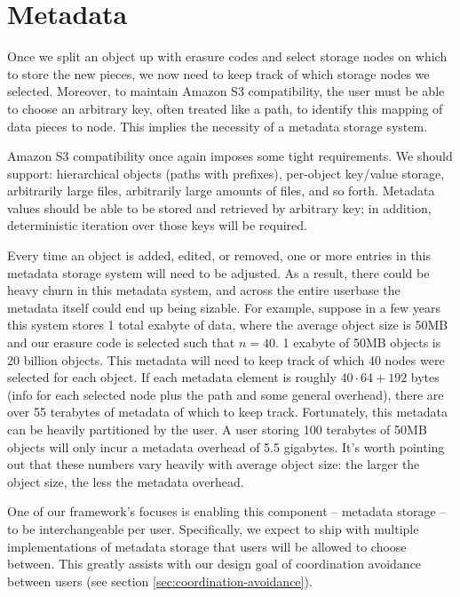 \documentclass[11pt,fleqn,openany]{book}
\begin{document}
\section{Metadata}

Once we split an object up with erasure codes and select storage nodes on
which to store the new pieces, we now need to keep track of which storage
nodes we selected.
Moreover, to maintain Amazon S3 compatibility, the user must be able to choose an
arbitrary key, often treated like a path, to identify this mapping of data
pieces to node. This implies the necessity of a metadata storage system.

Amazon S3 compatibility once again imposes some tight requirements.
We should support:
hierarchical objects (paths with prefixes), per-object key/value storage,
arbitrarily large files, arbitrarily large amounts of files, and so forth.
Metadata values
should be able to be stored and retrieved by arbitrary key; in addition,
deterministic iteration over those keys will be required.

Every time an
object is added, edited, or removed, one or more entries in this metadata
storage system will need to be adjusted. As a result, there could be heavy churn
in this metadata system, and across the entire userbase the metadata itself
could end up being sizable.
For example, suppose in
a few years this system stores 1 total exabyte of data, where the average object
size is 50MB and our erasure code is selected such that $n=40$.
1 exabyte of 50MB objects is 20 billion objects.
This metadata will need
to keep track of which 40 nodes were selected for each object.
If each metadata element is roughly $40\cdot 64+192$ bytes (info for each
selected node plus the path and some general overhead), there are over 55
terabytes of metadata of which to keep track.
Fortunately, this metadata can be heavily partitioned by the user. A user storing
100 terabytes of 50MB objects will only incur a metadata overhead of 5.5
gigabytes. It's worth pointing out that these numbers vary
heavily with average object size: the larger the object size, the less the
metadata overhead.

One of our framework's focuses is enabling this component -- metadata
storage -- to be interchangeable per user. Specifically, we expect to ship with
multiple implementations of metadata storage that users will be allowed to
choose between. This greatly assists with our design goal of coordination
avoidance between users (see section \ref{sec:coordination-avoidance}).
\end{document}
